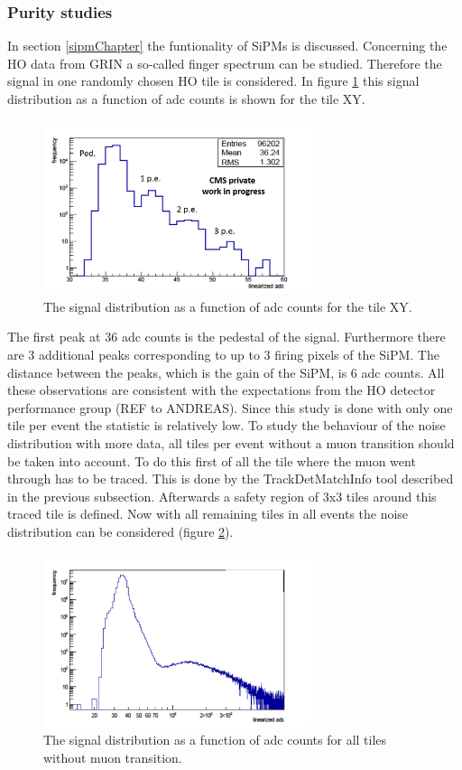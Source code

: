 		\subsubsection{Purity studies}
			In section \ref{sipmChapter} the funtionality of SiPMs is discussed.
			Concerning the HO data from GRIN a so-called finger spectrum can be studied.
			Therefore the signal in one randomly chosen HO tile is considered.
			In figure \ref{fig:noise_low} this signal distribution as a function of adc counts is shown for the tile XY.
			\begin{figure}[htbp]
				\centering
				\includegraphics[width=0.70\textwidth]{Figures/erdogan/noise_low.png}
				\caption{The signal distribution as a function of adc counts for the tile XY.}
				\label{fig:noise_low}
			\end{figure}
			The first peak at 36 adc counts is the pedestal of the signal.
			Furthermore there are 3 additional peaks corresponding to up to 3 firing pixels of the SiPM.
			The distance between the peaks, which is the gain of the SiPM, is 6 adc counts.
			All these observations are consistent with the expectations from the HO detector performance group (REF to ANDREAS).
			Since this study is done with only one tile per event the statistic is relatively low.
			To study the behaviour of the noise distribution with more data, all tiles per event without a muon transition should be taken into account.
			To do this first of all the tile where the muon went through has to be traced.
			This is done by the TrackDetMatchInfo tool described in the previous subsection.
			Afterwards a safety region of 3x3 tiles around this traced tile is defined.
			Now with all remaining tiles in all events the noise distribution can be considered (figure \ref{fig:noise_high}).
			\begin{figure}[htbp]
				\centering
				\includegraphics[width=0.70\textwidth]{Figures/erdogan/noise_high.png}
				\caption{The signal distribution as a function of adc counts for all tiles without muon transition.}
				\label{fig:noise_high}
			\end{figure}
